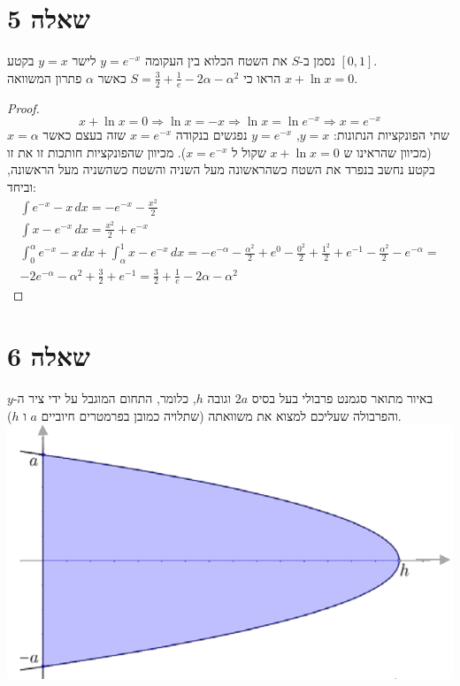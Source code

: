 \documentclass{article}
\begin{document}
	\section*{שאלה 5}
	נסמן ב-$S$ את השטח הכלוא בין העקומה $y = e^{-x}$ לישר $y=x$ בקטע $[0,1]$. \\
	הראו כי ${S = \frac{3}{2} + \frac{1}{e} - 2\alpha - \alpha^2}$ כאשר $\alpha$ פתרון המשוואה $x + \ln x = 0$.
	\begin{proof}
		\[
			x + \ln x = 0 \Rightarrow
			\ln x = -x \Rightarrow
			\ln x = \ln e^{-x} \Rightarrow
			x = e^{-x}
		\]
		שתי הפונקציות הנתונות: $y = x$, $y = e^{-x}$ נפגשים בנקודה $x = e^{-x}$ שזה בעצם כאשר $x = \alpha$(מכיוון שהראינו ש $x + \ln x = 0 $ שקול ל $x = e^{-x}$).
		מכיוון שהפונקציות חותכות זו את זו בקטע נחשב בנפרד את השטח כשהראשונה מעל השניה והשטח כשהשניה מעל הראשונה, וביחד:
		\setcounter{equation}{0} \begin{align}
			\int e^{-x} - x \,dx = -e^{-x} - \frac{x^2}{2} \\
			\int x - e^{-x} \,dx = \frac{x^2}{2} + e^{-x} \\
			\int_0^{\alpha} e^{-x} - x \,dx + \int_{\alpha}^1 x - e^{-x} \,dx =
			-e^{-\alpha} - \frac{\alpha^2}{2} + e^0 - \frac{0^2}{2} + \frac{1^2}{2} + e^{-1} - \frac{\alpha^2}{2} - e^{-\alpha} = \\
			-2e^{-\alpha} - \alpha^2 + \frac{3}{2} + e^{-1} =
			\boxed{\frac{3}{2} + \frac{1}{e} - 2\alpha - \alpha^2}  \nonumber
		\end{align}
	\end{proof}

	\pagebreak
	\section*{שאלה 6}
	באיור מתואר סגמנט פרבולי בעל בסיס $2a$ וגובה $h$, כלומר, התחום המוגבל על ידי ציר ה-$y$
	והפרבולה שעליכם למצוא את משוואתה (שתלויה כמובן בפרמטרים חיוביים $a$ ו $h$). \\
	\includegraphics[scale=0.45]{parabolic-segment}
\end{document}
